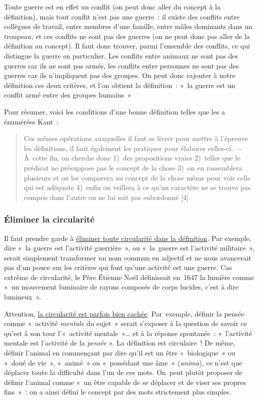 \documentclass[a4paper,12pt]{article}
\begin{document}
Toute guerre est en effet un conflit (on peut donc aller du concept à la
définition), mais tout conflit n'est pas une guerre : il existe des
conflits entre collègues de travail, entre membres d'une famille, entre
mâles dominants dans un troupeau, et ces conflits ne sont pas des
guerres (on ne peut donc pas aller de la définition au concept). Il faut
donc trouver, parmi l'ensemble des conflits, ce qui distingue la guerre
en particulier. Les conflits entre animaux ne sont pas des guerres car
ils ne sont pas armés, les conflits entre personnes ne sont pas des
guerres car ils n'impliquent pas des groupes. On peut donc rajouter à
notre définition ces deux critères, et l'on obtient la définition : « la
guerre est un conflit armé entre des groupes humains »

Pour résumer, voici les conditions d'une bonne définition telles que les
a énumérées Kant :
\begin{quote}
Ces mêmes opérations auxquelles il faut se livrer pour mettre à
l'épreuve les définitions, il faut également les pratiquer pour
élaborer celles-ci. --- À cette fin, on cherche donc 1) des
propositions vraies 2) telles que le prédicat ne présuppose pas le
concept de la chose 3) on en rassemblera plusieurs et on les comparera
au concept de la chose même pour voir celle qui est adéquate 4) enfin
on veillera à ce qu'un caractère ne se trouve pas compris dans l'autre
ou ne lui soit pas subordonné [4].
\end{quote}

\subsubsection{Éliminer la circularité}
\label{sec:org827492b}

Il faut prendre garde à \uline{éliminer toute circularité dans la définition}.
Par exemple, dire « la guerre est l'activité guerrière », ou « la guerre
est l'activité militaire », serait simplement transformer un nom commun
en adjectif et ne nous avancerait pas d'un pouce sur les critères qui
font qu'une activité est une guerre. Cas extrême de circularité, le Père
Étienne Noël définissait en 1647 la lumière comme « un mouvement
luminaire de rayons composés de corps lucides, c'est à dire lumineux ».

Attention, \uline{la circularité est parfois bien cachée}. Par exemple,
définir la pensée comme « activité \emph{mentale} du sujet » serait s'exposer
à la question de savoir ce qu'est à son tour l'« activité mentale »\ldots{}
et à la réponse spontanée : « l'activité mentale est l'activité de la
\emph{pensée} ». La définition est circulaire ! De même, définir l'animal en
commençant par dire qu'il est un être « biologique » ou « doué de vie »,
« animé » ou « possédant une âme » (\emph{anima}), ce n'est que déplacer
toute la difficulté dans l'un de ces mots. On peut plutôt proposer de
définir l'animal comme « un être capable de se déplacer et de viser ses
propres fins » : on a ainsi défini le concept par des mots strictement
plus simples.
\end{document}
